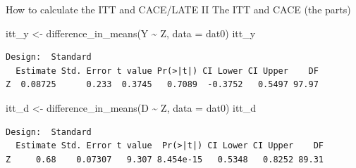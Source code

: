 \documentclass[
  ignorenonframetext,
]{beamer}
\newenvironment{Shaded}{\begin{snugshade}}{\end{snugshade}}
\newcommand{\AttributeTok}[1]{\textcolor[rgb]{0.77,0.63,0.00}{#1}}
\newcommand{\FunctionTok}[1]{\textcolor[rgb]{0.00,0.00,0.00}{#1}}
\newcommand{\NormalTok}[1]{#1}
\newcommand{\OtherTok}[1]{\textcolor[rgb]{0.56,0.35,0.01}{#1}}
\newcommand{\SpecialCharTok}[1]{\textcolor[rgb]{0.00,0.00,0.00}{#1}}
\begin{document}
\begin{frame}[fragile]{How to calculate the ITT and CACE/LATE II}
\protect\hypertarget{how-to-calculate-the-itt-and-cacelate-ii}{}
The ITT and CACE (the parts)

\scriptsize

\begin{Shaded}
\begin{Highlighting}[]
\NormalTok{itt\_y }\OtherTok{\textless{}{-}} \FunctionTok{difference\_in\_means}\NormalTok{(Y }\SpecialCharTok{\textasciitilde{}}\NormalTok{ Z, }\AttributeTok{data =}\NormalTok{ dat0)}
\NormalTok{itt\_y}
\end{Highlighting}
\end{Shaded}

\begin{verbatim}
Design:  Standard 
  Estimate Std. Error t value Pr(>|t|) CI Lower CI Upper    DF
Z  0.08725      0.233  0.3745   0.7089  -0.3752   0.5497 97.97
\end{verbatim}

\begin{Shaded}
\begin{Highlighting}[]
\NormalTok{itt\_d }\OtherTok{\textless{}{-}} \FunctionTok{difference\_in\_means}\NormalTok{(D }\SpecialCharTok{\textasciitilde{}}\NormalTok{ Z, }\AttributeTok{data =}\NormalTok{ dat0)}
\NormalTok{itt\_d}
\end{Highlighting}
\end{Shaded}

\begin{verbatim}
Design:  Standard 
  Estimate Std. Error t value  Pr(>|t|) CI Lower CI Upper    DF
Z     0.68    0.07307   9.307 8.454e-15   0.5348   0.8252 89.31
\end{verbatim}

\normalsize
\end{frame}
\end{document}
